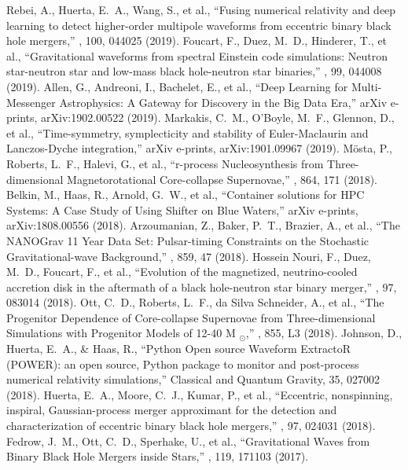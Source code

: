 Rebei, A., Huerta, E.~A., Wang, S., et al., ``Fusing numerical relativity and deep learning to detect higher-order multipole waveforms from eccentric binary black hole mergers,'' \prd, 100, 044025 (2019).
 Foucart, F., Duez, M.~D., Hinderer, T., et al., ``Gravitational waveforms from spectral Einstein code simulations: Neutron star-neutron star and low-mass black hole-neutron star binaries,'' \prd, 99, 044008 (2019).
 Allen, G., Andreoni, I., Bachelet, E., et al., ``Deep Learning for Multi-Messenger Astrophysics: A Gateway for Discovery in the Big Data Era,'' arXiv e-prints, arXiv:1902.00522 (2019).
 Markakis, C.~M., O'Boyle, M.~F., Glennon, D., et al., ``Time-symmetry, symplecticity and stability of Euler-Maclaurin and Lanczos-Dyche integration,'' arXiv e-prints, arXiv:1901.09967 (2019).
 M{\"o}sta, P., Roberts, L.~F., Halevi, G., et al., ``r-process Nucleosynthesis from Three-dimensional Magnetorotational Core-collapse Supernovae,'' \apj, 864, 171 (2018).
 Belkin, M., Haas, R., Arnold, G.~W., et al., ``Container solutions for HPC Systems: A Case Study of Using Shifter on Blue Waters,'' arXiv e-prints, arXiv:1808.00556 (2018).
 Arzoumanian, Z., Baker, P.~T., Brazier, A., et al., ``The NANOGrav 11 Year Data Set: Pulsar-timing Constraints on the Stochastic Gravitational-wave Background,'' \apj, 859, 47 (2018).
 Hossein Nouri, F., Duez, M.~D., Foucart, F., et al., ``Evolution of the magnetized, neutrino-cooled accretion disk in the aftermath of a black hole-neutron star binary merger,'' \prd, 97, 083014 (2018).
 Ott, C.~D., Roberts, L.~F., da Silva Schneider, A., et al., ``The Progenitor Dependence of Core-collapse Supernovae from Three-dimensional Simulations with Progenitor Models of 12-40 M $_{{\ensuremath{\odot}}}$,'' \apjl, 855, L3 (2018).
 Johnson, D., Huerta, E.~A., \& Haas, R., ``Python Open source Waveform ExtractoR (POWER): an open source, Python package to monitor and post-process numerical relativity simulations,'' Classical and Quantum Gravity, 35, 027002 (2018).
 Huerta, E.~A., Moore, C.~J., Kumar, P., et al., ``Eccentric, nonspinning, inspiral, Gaussian-process merger approximant for the detection and characterization of eccentric binary black hole mergers,'' \prd, 97, 024031 (2018).
 Fedrow, J.~M., Ott, C.~D., Sperhake, U., et al., ``Gravitational Waves from Binary Black Hole Mergers inside Stars,'' \prl, 119, 171103 (2017).
